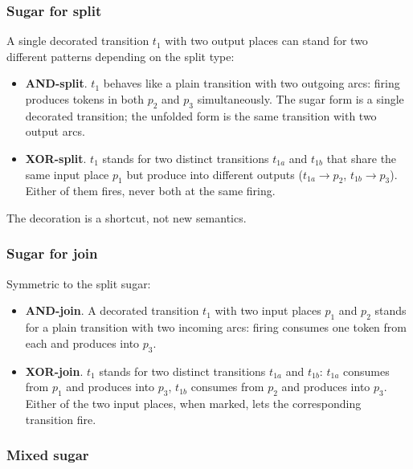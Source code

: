 \subsubsection{Sugar for split}

A single decorated transition $t_1$ with two output places can stand for two different patterns depending on the split type:

\begin{itemize}
  \item \textbf{AND-split}. $t_1$ behaves like a plain transition with two outgoing arcs: firing produces tokens in both $p_2$ and $p_3$ simultaneously. The sugar form is a single decorated transition; the unfolded form is the same transition with two output arcs.
  \item \textbf{XOR-split}. $t_1$ stands for two distinct transitions $t_{1a}$ and $t_{1b}$ that share the same input place $p_1$ but produce into different outputs ($t_{1a} \to p_2$, $t_{1b} \to p_3$). Either of them fires, never both at the same firing.
\end{itemize}

The decoration is a shortcut, not new semantics.

\subsubsection{Sugar for join}

Symmetric to the split sugar:

\begin{itemize}
  \item \textbf{AND-join}. A decorated transition $t_1$ with two input places $p_1$ and $p_2$ stands for a plain transition with two incoming arcs: firing consumes one token from each and produces into $p_3$.
  \item \textbf{XOR-join}. $t_1$ stands for two distinct transitions $t_{1a}$ and $t_{1b}$: $t_{1a}$ consumes from $p_1$ and produces into $p_3$, $t_{1b}$ consumes from $p_2$ and produces into $p_3$. Either of the two input places, when marked, lets the corresponding transition fire.
\end{itemize}

\subsubsection{Mixed sugar}

